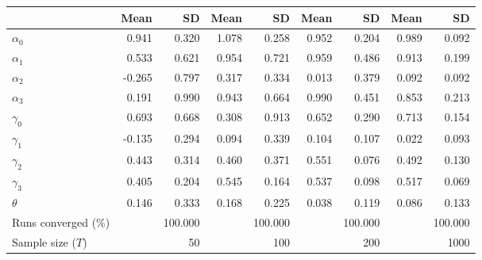 
\begin{tabular}[t]{lrrrrrrrr}
\toprule
  & Mean & SD & Mean  & SD  & Mean   & SD   & Mean    & SD   \\
\midrule
$\alpha_{0}$ & 0.941 & 0.320 & 1.078 & 0.258 & 0.952 & 0.204 & 0.989 & 0.092\\
$\alpha_{1}$ & 0.533 & 0.621 & 0.954 & 0.721 & 0.959 & 0.486 & 0.913 & 0.199\\
$\alpha_{2}$ & -0.265 & 0.797 & 0.317 & 0.334 & 0.013 & 0.379 & 0.092 & 0.092\\
$\alpha_{3}$ & 0.191 & 0.990 & 0.943 & 0.664 & 0.990 & 0.451 & 0.853 & 0.213\\
$\gamma_{0}$ & 0.693 & 0.668 & 0.308 & 0.913 & 0.652 & 0.290 & 0.713 & 0.154\\
$\gamma_{1}$ & -0.135 & 0.294 & 0.094 & 0.339 & 0.104 & 0.107 & 0.022 & 0.093\\
$\gamma_{2}$ & 0.443 & 0.314 & 0.460 & 0.371 & 0.551 & 0.076 & 0.492 & 0.130\\
$\gamma_{3}$ & 0.405 & 0.204 & 0.545 & 0.164 & 0.537 & 0.098 & 0.517 & 0.069\\
$\theta$ & 0.146 & 0.333 & 0.168 & 0.225 & 0.038 & 0.119 & 0.086 & 0.133\\
Runs converged (\%) &  & 100.000 &  & 100.000 &  & 100.000 &  & 100.000\\
Sample size ($T$) &  & 50 &  & 100 &  & 200 &  & 1000\\
\bottomrule
\end{tabular}
